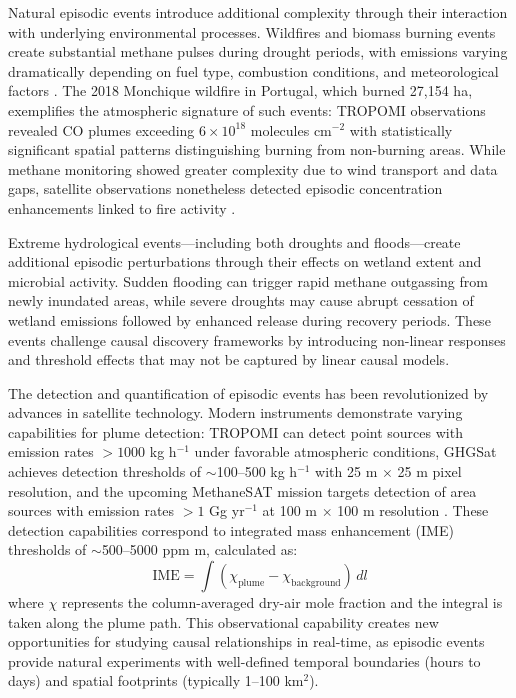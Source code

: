 Natural episodic events introduce additional complexity through their interaction with underlying environmental processes. Wildfires and biomass burning events create substantial methane pulses during drought periods, with emissions varying dramatically depending on fuel type, combustion conditions, and meteorological factors \cite{Pandey2017}. The 2018 Monchique wildfire in Portugal, which burned 27,154 ha, exemplifies the atmospheric signature of such events: TROPOMI observations revealed CO plumes exceeding $6 \times 10^{18}$ molecules cm$^{-2}$ with statistically significant spatial patterns distinguishing burning from non-burning areas. While methane monitoring showed greater complexity due to wind transport and data gaps, satellite observations nonetheless detected episodic concentration enhancements linked to fire activity \cite{portugal_fire_2021}.

Extreme hydrological events—including both droughts and floods—create additional episodic perturbations through their effects on wetland extent and microbial activity. Sudden flooding can trigger rapid methane outgassing from newly inundated areas, while severe droughts may cause abrupt cessation of wetland emissions followed by enhanced release during recovery periods. These events challenge causal discovery frameworks by introducing non-linear responses and threshold effects that may not be captured by linear causal models.

The detection and quantification of episodic events has been revolutionized by advances in satellite technology. Modern instruments demonstrate varying capabilities for plume detection: TROPOMI can detect point sources with emission rates $>1000$ kg  h$^{-1}$ under favorable atmospheric conditions, GHGSat achieves detection thresholds of $\sim$100--500 kg  h$^{-1}$ with 25 m $\times$ 25 m pixel resolution, and the upcoming MethaneSAT mission targets detection of area sources with emission rates $>1$ Gg  yr$^{-1}$ at 100 m $\times$ 100 m resolution \cite{Varon2019, Varon2020, Guanter2021, Sherwin2024}. These detection capabilities correspond to integrated mass enhancement (IME) thresholds of $\sim$500--5000 ppm m, calculated as:
\begin{equation}
	\text{IME} = \int (\chi_{\text{plume}} - \chi_{\text{background}}) \, dl
\end{equation}
where $\chi$ represents the column-averaged dry-air mole fraction and the integral is taken along the plume path. This observational capability creates new opportunities for studying causal relationships in real-time, as episodic events provide natural experiments with well-defined temporal boundaries (hours to days) and spatial footprints (typically 1--100 km$^2$).


